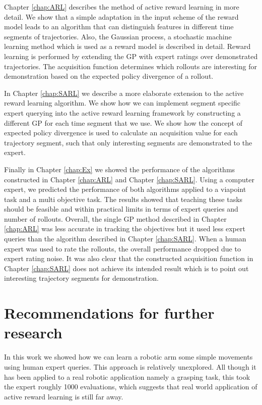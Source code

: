 \documentclass[mscThesis.tex]{subfiles}
\begin{document}
Chapter \ref{chap:ARL} describes the method of active reward learning in more detail. We show that a simple adaptation in the input scheme of the reward model leads to an algorithm that can distinguish features in different time segments of trajectories. Also, the Gaussian process, a stochastic machine learning method which is used as a reward model is described in detail. Reward learning is performed by extending the GP with expert ratings over demonstrated trajectories. The acquisition function determines which rollouts are interesting for demonstration based on the expected policy divergence of a rollout.

In Chapter \ref{chap:SARL} we describe a more elaborate extension to the active reward learning algorithm. We show how we can implement segment specific expert querying into the active reward learning framework by constructing a different GP for each time segment that we use. We show how the concept of expected policy divergence is used to calculate an acquisition value for each trajectory segment, such that only interesting segments are demonstrated to the expert. 

Finally in Chapter \ref{chap:Ex} we showed the performance of the algorithms constructed in Chapter \ref{chap:ARL} and Chapter \ref{chap:SARL}. Using a computer expert, we predicted the performance of both algorithms applied to a viapoint task and a multi objective task. The results showed that teaching these tasks should be feasible and within practical limits in terms of expert queries and number of rollouts. Overall, the single GP method described in Chapter \ref{chap:ARL} was less accurate in tracking the objectives but it used less expert queries than the algorithm described in Chapter \ref{chap:SARL}. When a human expert was used to rate the rollouts, the overall performance dropped due to expert rating noise. It was also clear that the constructed acquisition function in Chapter \ref{chap:SARL} does not achieve its intended result which is to point out interesting trajectory segments for demonstration.

\section{Recommendations for further research}
\label{sec:recommendations}
In this work we showed how we can learn a robotic arm some simple movements using human expert queries. This approach is relatively unexplored. All though it has been applied to a real robotic application namely a grasping task, this took the expert roughly 1000 evaluations, which suggests that real world application of active reward learning is still far away. 
\end{document}
